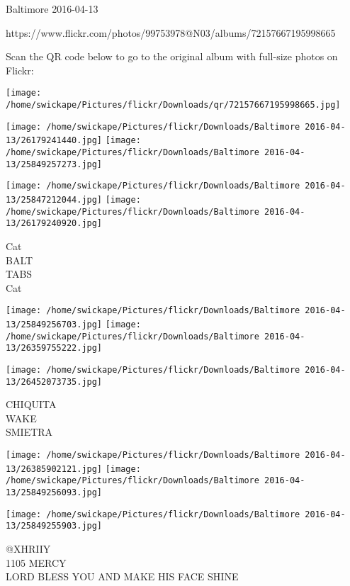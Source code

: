 \documentclass[10pt,letterpaper]{article}
\begin{document}
Baltimore 2016-04-13

https://www.flickr.com/photos/99753978@N03/albums/72157667195998665

Scan the QR code below to go to the original album with full-size photos on Flickr:

\texttt{[image: /home/swickape/Pictures/flickr/Downloads/qr/72157667195998665.jpg]}
\pagebreak

\texttt{[image: /home/swickape/Pictures/flickr/Downloads/Baltimore 2016-04-13/26179241440.jpg]}
\texttt{[image: /home/swickape/Pictures/flickr/Downloads/Baltimore 2016-04-13/25849257273.jpg]}

\texttt{[image: /home/swickape/Pictures/flickr/Downloads/Baltimore 2016-04-13/25847212044.jpg]}
\texttt{[image: /home/swickape/Pictures/flickr/Downloads/Baltimore 2016-04-13/26179240920.jpg]}

Cat\\
BALT\\
TABS\\
Cat\\
\pagebreak

\texttt{[image: /home/swickape/Pictures/flickr/Downloads/Baltimore 2016-04-13/25849256703.jpg]}
\texttt{[image: /home/swickape/Pictures/flickr/Downloads/Baltimore 2016-04-13/26359755222.jpg]}

\vspace{0.25in}
\texttt{[image: /home/swickape/Pictures/flickr/Downloads/Baltimore 2016-04-13/26452073735.jpg]}

CHIQUITA\\
WAKE\\
SMIETRA\\
\pagebreak

\texttt{[image: /home/swickape/Pictures/flickr/Downloads/Baltimore 2016-04-13/26385902121.jpg]}
\texttt{[image: /home/swickape/Pictures/flickr/Downloads/Baltimore 2016-04-13/25849256093.jpg]}

\texttt{[image: /home/swickape/Pictures/flickr/Downloads/Baltimore 2016-04-13/25849255903.jpg]}

@XHRIIY\\
1105 MERCY\\
LORD BLESS YOU AND MAKE HIS FACE SHINE\\
\pagebreak
\end{document}
